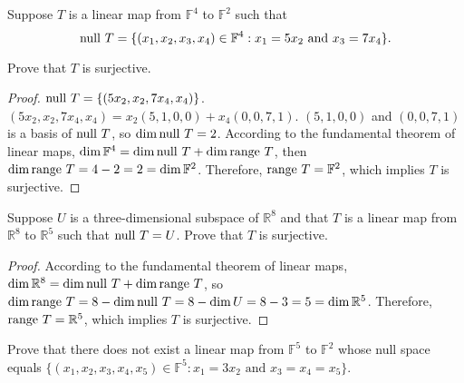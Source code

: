 \begin{exercise}
    Suppose $T$ is a linear map from $\mathbb{F}^{4}$ to $\mathbb{F}^{2}$ such that
    \[
        \operatorname{null}\,{T} = \{ (x_{1}, x_{2}, x_{3}, x_{4})\in\mathbb{F}^{4} : x_{1} = 5x_{2} \text{ and } x_{3} = 7x_{4} \}.
    \]

    Prove that $T$ is surjective.
\end{exercise}

\begin{proof}
    $\operatorname{null}\,{T} = \{ (5x_{2}, x_{2}, 7x_{4}, x_{4}) \}$. $(5x_{2}, x_{2}, 7x_{4}, x_{4}) = x_{2}(5, 1, 0, 0) + x_{4}(0, 0, 7, 1)$. $(5, 1, 0, 0)$ and $(0, 0, 7, 1)$ is a basis of $\operatorname{null}\,{T}$, so $\dim\operatorname{null}\,{T} = 2$. According to the fundamental theorem of linear maps, $\dim\mathbb{F}^{4} = \dim\operatorname{null}\,{T} + \dim\operatorname{range}\,{T}$, then $\dim\operatorname{range}\,{T} = 4 - 2 = 2 = \dim\mathbb{F}^{2}$. Therefore, $\operatorname{range}\,{T} = \mathbb{F}^{2}$, which implies $T$ is surjective.
\end{proof}
\newpage

\begin{exercise}
    Suppose $U$ is a three-dimensional subspace of $\mathbb{R}^{8}$ and that $T$ is a linear map from $\mathbb{R}^{8}$ to $\mathbb{R}^{5}$ such that $\operatorname{null}\,{T}= U$. Prove that $T$ is surjective.
\end{exercise}

\begin{proof}
    According to the fundamental theorem of linear maps, $\dim\mathbb{R}^{8} = \dim\operatorname{null}\,{T} + \dim\operatorname{range}\,{T}$, so $\dim\operatorname{range}\,{T} = 8 - \dim\operatorname{null}\,{T} = 8 - \dim U = 8 - 3 = 5 = \dim\mathbb{R}^{5}$. Therefore, $\operatorname{range}\,{T} = \mathbb{R}^{5}$, which implies $T$ is surjective.
\end{proof}
\newpage

\begin{exercise}
    Prove that there does not exist a linear map from $\mathbb{F}^{5}$ to $\mathbb{F}^{2}$ whose null space equals $\{(x_{1} , x_{2} , x_{3} , x_{4} , x_{5} ) \in \mathbb{F}^{5} : x_{1} = 3x_{2} \text{ and } x_{3} = x_{4} = x_{5} \}$.
\end{exercise}

